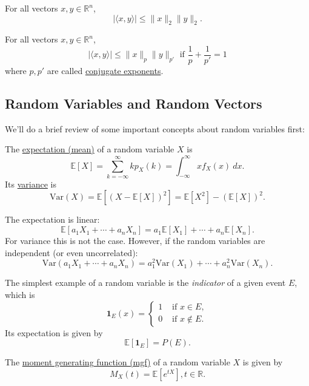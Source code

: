 \begin{theorem}
\label{thm:1.2.5}
For all vectors $x, y \in \mathbb{R}^n$, 
\[ |\langle x, y \rangle| \leq \lVert x \rVert_{2} \lVert y \rVert_{2}. \]
\end{theorem}

\begin{theorem}
\label{thm:1.2.6}
For all vectors $x, y \in \mathbb{R}^n$, 
\[ |\langle x, y \rangle| \leq \lVert x \rVert_{p} \lVert y \rVert_{p'} \text{ if } 
\frac{1}{p} + \frac{1}{p'} = 1 \]
where $p, p'$ are called \underline{conjugate exponents}.
\end{theorem}


\subsection{Random Variables and Random Vectors}

We'll do a brief review of some important concepts about random variables first: 
\begin{definition}[]
\label{def:1.3.1}
The \underline{expectation (mean)} of a random variable $X$ is 
\[ \mathbb{E}[X] = \sum_{k = -\infty}^{\infty} k p_X(k) = \int_{-\infty}^{\infty} x f_X(x) \ dx. \]
Its \underline{variance} is 
\[ \mathrm{Var}(X) = \mathbb{E}[(X - \mathbb{E}[X])^2] = \mathbb{E}[X^2] - (\mathbb{E}[X])^2. \]
\end{definition}

The expectation is linear: 
\[ \mathbb{E}[a_1 X_1 + \cdots + a_n X_n] = a_1 \mathbb{E}[X_1] + \cdots + a_n \mathbb{E}[X_n]. \]
For variance this is not the case. However, if the random variables are independent (or even uncorrelated): 
\[ \mathrm{Var}(a_1 X_1 + \cdots + a_n X_n) = a_1^2 \mathrm{Var}(X_1) + \cdots + a_n^2 \mathrm{Var}(X_n). \]

The simplest example of a random variable is the \textit{indicator} of a given event $E$, which is 
\[ \mathbf{1}_E(x) = \begin{cases}
	1 & \text{ if } x \in E, \\
	0 & \text{ if } x \notin E.
\end{cases} \]
Its expectation is given by 
\[ \mathbb{E}[\mathbf{1}_E] = P(E). \]

\begin{definition}[]
\label{def:1.3.2}
The \underline{moment generating function (mgf)} of a random variable $X$ is given by 
\[ M_X(t) = \mathbb{E}[e^{tX}], t \in \mathbb{R}. \]
\end{definition}


